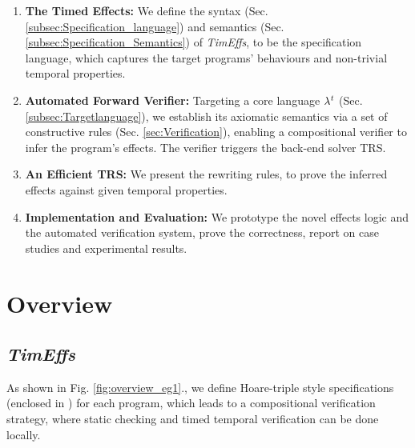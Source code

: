 \documentclass[acmsmall,10pt,review]{acmart}
\newcommand{\timedEffects}{\emph{TimEffs}}
\newcommand{\code}[1]{{\tt{\ensuremath{\m{#1}}}}}
\newcommand{\m}{\mathit}
\newcommand\figref[1]{Fig. \textcolor{black}{\ref{#1}}.}
\newcommand\secref[1]{Sec. \textcolor{black}{\ref{#1}}}
\newcommand{\timedL}{\code{\lambda^{t}}}
\begin{document}
\begin{enumerate}
\item \textbf{The Timed Effects:} We define the syntax 
({\secref{subsec:Specification_language}}) and semantics 
({\secref{subsec:Specification_Semantics}}) of \timedEffects, to be the 
specification language, which captures the target programs' behaviours 
and non-trivial temporal properties.

\item \textbf{Automated Forward Verifier:} Targeting a core language 
\code{\timedL} ({\secref{subsec:Targetlanguage}}), we 
establish its axiomatic semantics via a set of constructive rules 
(\secref{sec:Verification}), enabling a compositional verifier to 
infer the program's effects. The verifier triggers the back-end 
solver TRS. 


\item \textbf{An Efficient TRS:}
We present the rewriting rules, to prove 
the inferred effects against given temporal properties. %


\item \textbf{Implementation and Evaluation:} We prototype the novel 
effects logic and the automated verification system, %
prove the correctness, report on case studies and experimental results. 


\end{enumerate} 




\section{Overview}\label{sec:Overview}

\subsection{\timedEffects}
As shown in \figref{fig:overview_eg1}, we define Hoare-triple style specifications (enclosed in \textcolor{darklavender}{}) for each program, which leads to a compositional verification strategy, where static checking and timed temporal verification can be done locally. %
\end{document}
